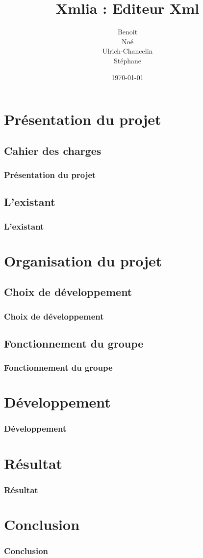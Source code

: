 \documentclass{beamer}
\title{Xmlia : Editeur Xml}
\author []{
\bsc{BOIVIN} Benoit\\
\bsc{LE PHILIPPE} Noé\\
\bsc{KEGBA-SANGO-SANGO} Ulrich-Chancelin\\
\bsc{WOUTERS} Stéphane
}
\institute{}
\date{\today}
\begin{document}
	\begin{frame}
		\titlepage
	\end{frame}
		


	\section{Présentation du projet}

	\subsection{Cahier des charges}

	\begin{frame}
		\frametitle{Présentation du projet}
	\end{frame}

	\subsection{L'existant}

	\begin{frame}
		\frametitle{L'existant}
	\end{frame}




	\section{Organisation du projet}

	\subsection{Choix de développement}

	\begin{frame}
		\frametitle{Choix de développement}
	\end{frame}

	\subsection{Fonctionnement du groupe}

	\begin{frame}
		\frametitle{Fonctionnement du groupe}
	\end{frame}




	\section{Développement}

	\begin{frame}
		\frametitle{Développement}
	\end{frame}



	\section{Résultat}

	\begin{frame}
		\frametitle{Résultat}
	\end{frame}


	\section{Conclusion}

	\begin{frame}
		\frametitle{Conclusion}
	\end{frame}
\end{document}
